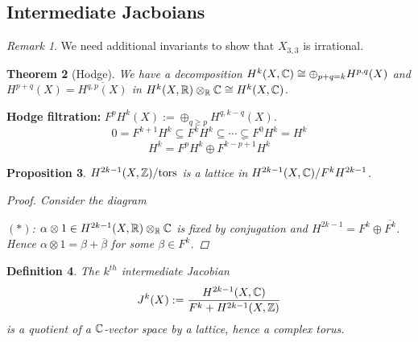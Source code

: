 \documentclass[A4paper, british, reqno]{amsart}
\theoremstyle{darkgreentheorem}
\newtheorem{thm}{Theorem}[section]
\newtheorem{prop}[thm]{Proposition}
\theoremstyle{darkbluedefinition}
\newtheorem{defn}[thm]{Definition}
\theoremstyle{darkredexample}
\theoremstyle{remark}
\newtheorem{rem}[thm]{Remark}
\newcommand{\1}{\mathbbm{1}}
\newcommand{\ot}{\otimes}
\newcommand{\op}{\oplus}
\newcommand{\sub}{\subseteq}
\begin{document}
\subsection{Intermediate Jacboians}

\begin{rem}
    We need additional invariants to show that $X_{3,3}$ is irrational.
\end{rem}

\begin{thm}[Hodge]
    We have a decomposition $H^{k}(X,\C)\cong \op_{p+q=k}H^{p,q}(X)$ and $H^{p+q}(X)=\overline{H^{q,p}(X)}$ in $H^{k}(X,\R)\ot_{\R}\C\cong H^{k}(X,\C)$.
\end{thm}

\textbf{Hodge filtration:}
$F^{p}H^{k}(X):=\op_{q\geqslant p}H^{q,k-q}(X)$.
\[ 0=F^{k+1}H^{k}\sub F^{k}H^{k}\sub \cdots \sub F^{0}H^{k}=H^{k} \]
\[ H^{k}=F^{p}H^{k}\op \overline{F^{k-p+1}H^{k}} \]

\begin{prop}
    $H^{2k-1}(X,\mathbb{Z})/\text{tors}$ is a lattice in $H^{2k-1}(X,\mathbb{C})/F^{k}H^{2k-1}$.
    \begin{proof}
	Consider the diagram
	\begin{center}
	\end{center}
	$(*)$: $\alpha\ot 1\in H^{2k-1}(X,\R)\ot_{\R}\C$ is fixed by conjugation and $H^{2k-1}=F^{k}\op \overline{F^{k}}$.
	Hence $\alpha\ot 1=\beta +\overline{\beta}$ for some $\beta \in F^{k}$.
    \end{proof}
\end{prop}

\begin{defn}
    The $k^{th}$ \textit{intermediate Jacobian}
    \[ J^{k}(X):=\frac{H^{2k-1}(X,\mathbb{C})}{F^{k}+H^{2k-1}(X,\mathbb{Z})} \]
    is a quotient of a $\mathbb{C}$-vector space by a lattice, hence a complex torus.
\end{defn}
\end{document}

